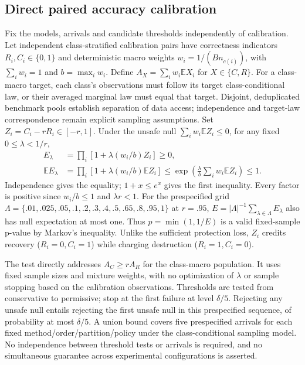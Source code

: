 \subsection{Direct paired accuracy calibration}
Fix the models, arrivals and candidate thresholds independently of calibration.
Let independent class-stratified calibration pairs have correctness indicators
$R_i,C_i\in\{0,1\}$ and deterministic macro weights
$w_i=1/(B n_{c(i)})$, with $\sum_iw_i=1$ and $b=\max_iw_i$.
Define $A_X=\sum_iw_i\mathbb E X_i$ for $X\in\{C,R\}$.
For a class-macro target, each class's observations must follow its target
class-conditional law, or their averaged marginal law must equal that target.
Disjoint, deduplicated benchmark pools establish separation of data access;
independence and target-law correspondence remain explicit sampling assumptions.
Set $Z_i=C_i-rR_i\in[-r,1]$. Under the unsafe null
$\sum_iw_i\mathbb E Z_i\leq0$, for any fixed $0\leq\lambda<1/r$,
\begin{align}
 E_\lambda&=\prod_i[1+\lambda(w_i/b)Z_i]\geq0,\\
 \mathbb E E_\lambda
 &=\prod_i[1+\lambda(w_i/b)\mathbb E Z_i]
 \leq\exp\!\left(\frac{\lambda}{b}\sum_iw_i\mathbb E Z_i\right)
 \leq1.
\end{align}
Independence gives the equality; $1+x\leq e^x$ gives the first inequality.
Every factor is positive since $w_i/b\leq1$ and $\lambda r<1$.
For the prespecified grid
$\Lambda=\{.01,.025,.05,.1,.2,.3,.4,.5,.65,.8,.95,1\}$ at $r=.95$,
$E=|\Lambda|^{-1}\sum_{\lambda\in\Lambda}E_\lambda$ also has null expectation
at most one. Thus $p=\min(1,1/E)$ is a valid fixed-sample p-value by Markov's
inequality. Unlike the sufficient protection loss, $Z_i$ credits recovery
($R_i=0,C_i=1$) while charging destruction ($R_i=1,C_i=0$).

The test directly addresses $A_C\geq rA_R$ for the class-macro population.
It uses fixed sample sizes and mixture weights, with no optimization of
$\lambda$ or sample stopping based on the calibration observations.
Thresholds are tested from conservative to permissive; stop at the first
failure at level $\delta/5$. Rejecting any unsafe null entails rejecting the
first unsafe null in this prespecified sequence, of probability at most
$\delta/5$. A union bound covers five prespecified arrivals for each fixed
method/order/partition/policy under the class-conditional sampling model.
No independence between threshold tests or arrivals is required, and no
simultaneous guarantee across experimental configurations is asserted.

